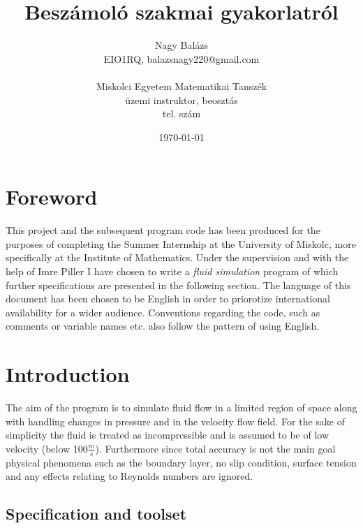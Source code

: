 \documentclass[12pt, titlepage]{article}
\begin{document}
\pagestyle{fancy}

\title{Beszámoló szakmai gyakorlatról}
\author{Nagy Balázs \\EIO1RQ, balazsnagy220@gmail.com\\\\Miskolci Egyetem Matematikai Tanszék\\üzemi instruktor, beosztás\\tel. szám}
\date{\today}
\maketitle

\tableofcontents

\pagebreak

\section{Foreword}

This project and the subsequent program code has been produced for the purposes of completing the Summer Internship at the University of Miskolc, more specifically at the Institute of Mathematics. Under the supervision and with the help of Imre Piller I have chosen to write a \textit{fluid simulation} program of which further specifications are presented in the following section. The language of this document has been chosen to be English in order to priorotize international availability for a wider audience. Conventions regarding the code, such as comments or variable names etc. also follow the pattern of using English.

\section{Introduction}

The aim of the program is to simulate fluid flow in a limited region of space along with handling changes in pressure and in the velocity flow field. For the sake of simplicity the fluid is treated as incompressible and is assumed to be of low velocity (below 100$\frac{m}{s}$). Furthermore since total accuracy is not the main goal physical phenomena such as the boundary layer, no slip condition, surface tension and any effects relating to Reynolds numbers are ignored.

\subsection{Specification and toolset}
\end{document}
